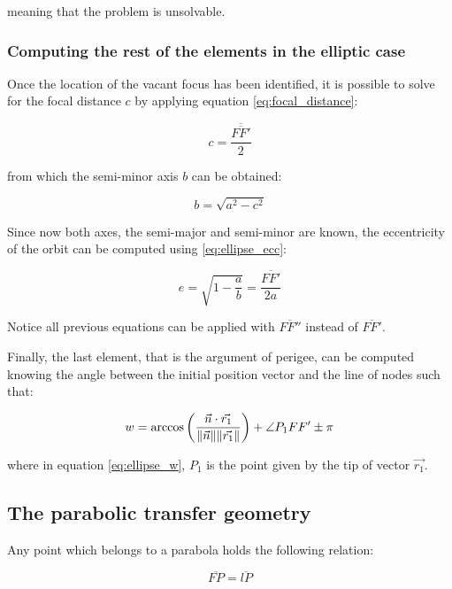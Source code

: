 meaning that the problem is unsolvable.

\subsubsection{Computing the rest of the elements in the elliptic case}
Once the location of the vacant focus has been identified, it is possible to
solve for the focal distance $c$ by applying equation \ref{eq:focal_distance}:

\begin{equation}
  c = \overline{\frac{\overline{FF'}}{2}}
  \label{eq:focal_distance}
\end{equation}

from which the semi-minor axis $b$ can be obtained:

\begin{equation}
  b = \sqrt{a^2 - c^2}
  \label{eq:focal_distance}
\end{equation}

Since now both axes, the semi-major and semi-minor are known, the eccentricity
of the orbit can be computed using \ref{eq:ellipse_ecc}:

\begin{equation}
  e = \sqrt{1 - \frac{a}{b}} = \frac{\overline{FF'}}{2a}
  \label{eq:ellipse_ecc}
\end{equation}

Notice all previous equations can be applied with $\overline{FF''}$ instead of
$\overline{FF'}$.

Finally, the last element, that is the argument of perigee, can be computed
knowing the angle between the initial position vector and the line of nodes such
that:

\begin{equation}
  w = \arccos{\left(\frac{\vec{n} \cdot \vec{r_{1}}}{\lVert\vec{n}\rVert
      \lVert\vec{r_{1}}\rVert} \right) + \angle P_{1}FF' \pm \pi}
  \label{eq:ellipse_w}
\end{equation}

where in equation \ref{eq:ellipse_w}, $P_{1}$ is the point given by the tip of
vector $\vec{r_{1}}$.

\subsection{The parabolic transfer geometry}

Any point which belongs to a parabola holds the following relation:

\begin{equation}
  \overline{FP} = \overline{lP}
  \label{eq:parabola_property}
\end{equation}


